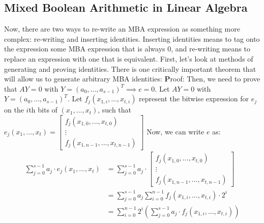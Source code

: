 \subsection{Mixed Boolean Arithmetic in Linear Algebra}
Now, there are two ways to re-write an MBA expression as something more complex:
re-writing and inserting identities. Inserting identities means to tag onto
the expression some MBA expression that is always 0, and re-writing means to 
replace an expression with one that is equivalent. First, let's look at methods
of generating and proving identities. There is one critically important theorem 
that will allow us to generate arbitrary MBA identities:
{\textbf Proof:} Then, we need to prove that $AY = 0$ with $Y = (a_0, ..., a_{s-1})^T \implies e = 0$. 
    Let $A Y = 0$ with $Y = (a_0, ..., a_{s-1})^T$. Let $f_j(x_{1,i}, ..., x_{t, i})$
    represent the bitwise expression for $e_j$ on the $i$th bits of $(x_1, ..., x_t)$, 
    such that $e_j(x_1, ..., x_t) = \begin{bmatrix}
        f_j(x_{1,0}, ..., x_{t, 0})\\
        \vdots \\
        f_j(x_{1,n-1}, ..., x_{t, n-1})
    \end{bmatrix}$
    Now, we can write
    $e$ as:
    \begin{align*}
        \sum_{j=0}^{s-1}a_j \cdot e_j(x_1, ..., x_t) &= \sum_{j=0}^{s-1} a_j \cdot \begin{bmatrix}
        f_j(x_{1,0}, ..., x_{t, 0})\\
        \vdots \\
        f_j(x_{1,n-1}, ..., x_{t, n-1})
        \end{bmatrix}\\
                                                     &= \sum_{j=0}^{s-1} a_j \sum_{i=0}^{n-1} f_j(x_{1,i}, ..., x_{t, i}) \cdot 2^{i}\\
                                                     &= \sum_{i=0}^{n-1} 2^i (\sum_{j=0}^{s-1} a_j \cdot f_j(x_{1,i}, ..., x_{t, i}) )
    \end{align*}
